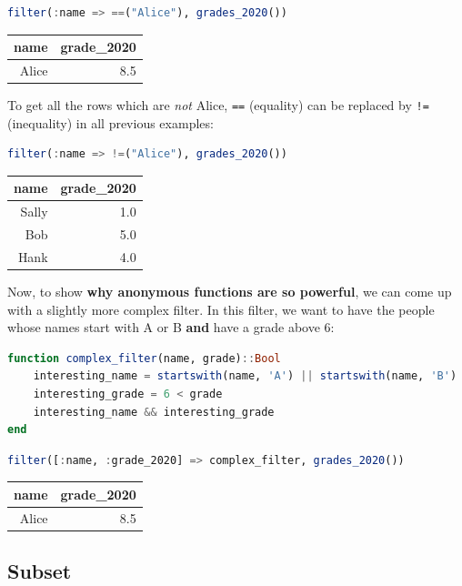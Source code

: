 \documentclass[
  notoc %
]{tufte-book}
\newcommand{\passthrough}[1]{#1}
\begin{document}
\begin{lstlisting}[language=Julia]
filter(:name => ==("Alice"), grades_2020())
\end{lstlisting}

\begin{longtable}[]{@{}rr@{}}
\toprule
name & grade\_2020 \\
\midrule
\endhead
Alice & 8.5 \\
\bottomrule
\end{longtable}

To get all the rows which are \emph{not} Alice,
\passthrough{\lstinline!==!} (equality) can be replaced by
\passthrough{\lstinline"!="} (inequality) in all previous examples:

\begin{lstlisting}[language=Julia]
filter(:name => !=("Alice"), grades_2020())
\end{lstlisting}

\begin{longtable}[]{@{}rr@{}}
\toprule
name & grade\_2020 \\
\midrule
\endhead
Sally & 1.0 \\
Bob & 5.0 \\
Hank & 4.0 \\
\bottomrule
\end{longtable}

Now, to show \textbf{why anonymous functions are so powerful}, we can
come up with a slightly more complex filter. In this filter, we want to
have the people whose names start with A or B \textbf{and} have a grade
above 6:

\begin{lstlisting}[language=Julia]
function complex_filter(name, grade)::Bool
    interesting_name = startswith(name, 'A') || startswith(name, 'B')
    interesting_grade = 6 < grade
    interesting_name && interesting_grade
end
\end{lstlisting}

\begin{lstlisting}[language=Julia]
filter([:name, :grade_2020] => complex_filter, grades_2020())
\end{lstlisting}

\begin{longtable}[]{@{}rr@{}}
\toprule
name & grade\_2020 \\
\midrule
\endhead
Alice & 8.5 \\
\bottomrule
\end{longtable}

\hypertarget{sec:subset}{%
\subsection{Subset}\label{sec:subset}}
\end{document}
